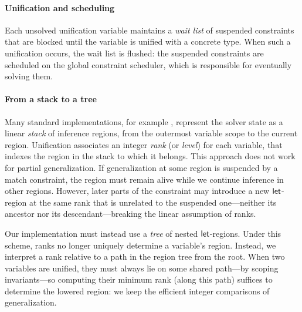 \documentclass[acmsmall,screen,nonacm,review]{acmart}
\begin{document}
\paragraph{Unification and scheduling}

Each unsolved unification variable maintains a \emph{wait list} of suspended
constraints that are blocked until the variable is unified with a concrete
type. When such a unification occurs, the wait list is flushed: the suspended
constraints are scheduled on the global constraint scheduler, which is
responsible for eventually solving them.

\paragraph{From a stack to a tree}



Many standard \ML implementations, for example \Inferno, represent the solver
state as a linear \emph{stack} of inference regions, from the outermost
variable scope to the current region. Unification associates
an integer \emph{rank} (or \emph{level}) for each variable, that indexes the
region in the stack to which it belongs.
%
This approach does not work for partial generalization. If
generalization at some region is suspended by a match constraint, the
region must remain alive while we continue inference in other
regions. However, later parts of the constraint may introduce a new
$\mathopen{}\mathrel{\mathsf{let}}$-region at the same rank that is unrelated to the suspended one---neither its
ancestor nor its descendant---breaking the linear assumption of ranks.

Our implementation must instead use a \emph{tree} of nested
$\mathopen{}\mathrel{\mathsf{let}}$-regions. Under this scheme, ranks no longer uniquely determine a
variable's region. Instead, we interpret a rank relative to a path in the
region tree from the root. When two variables are unified, they must always
lie on some shared path---by scoping invariants---so computing their minimum
rank (along this path) suffices to determine the lowered region: we keep
the efficient integer comparisons of generalization.
\end{document}
